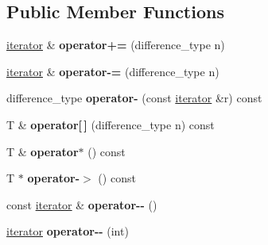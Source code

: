 \subsection*{Public Member Functions}
\begin{DoxyCompactItemize}
\item 
\hypertarget{classcircularDeque_1_1iterator_adab937de09a3bebfc08b5bdc13ab55c5}{\hyperlink{classcircularDeque_1_1iterator}{iterator} \& {\bfseries operator+=} (difference\+\_\+type n)}\label{classcircularDeque_1_1iterator_adab937de09a3bebfc08b5bdc13ab55c5}

\item 
\hypertarget{classcircularDeque_1_1iterator_ae465975e1491a6cb84a890ae8a762eea}{\hyperlink{classcircularDeque_1_1iterator}{iterator} \& {\bfseries operator-\/=} (difference\+\_\+type n)}\label{classcircularDeque_1_1iterator_ae465975e1491a6cb84a890ae8a762eea}

\item 
\hypertarget{classcircularDeque_1_1iterator_aec2396234b3a5d2d1449c5e83619917d}{difference\+\_\+type {\bfseries operator-\/} (const \hyperlink{classcircularDeque_1_1iterator}{iterator} \&r) const }\label{classcircularDeque_1_1iterator_aec2396234b3a5d2d1449c5e83619917d}

\item 
\hypertarget{classcircularDeque_1_1iterator_a21a49d0edbe140af0ed4b8ef1734f439}{T \& {\bfseries operator\mbox{[}$\,$\mbox{]}} (difference\+\_\+type n) const }\label{classcircularDeque_1_1iterator_a21a49d0edbe140af0ed4b8ef1734f439}

\item 
\hypertarget{classcircularDeque_1_1iterator_af85542e8915ee6e3cfd958221a789a52}{T \& {\bfseries operator$\ast$} () const }\label{classcircularDeque_1_1iterator_af85542e8915ee6e3cfd958221a789a52}

\item 
\hypertarget{classcircularDeque_1_1iterator_ad2d0ef1f228b917212a6d7a84fa6c938}{T $\ast$ {\bfseries operator-\/$>$} () const }\label{classcircularDeque_1_1iterator_ad2d0ef1f228b917212a6d7a84fa6c938}

\item 
\hypertarget{classcircularDeque_1_1iterator_ad85f34565b4f79c0e9c758e75594d04c}{const \hyperlink{classcircularDeque_1_1iterator}{iterator} \& {\bfseries operator-\/-\/} ()}\label{classcircularDeque_1_1iterator_ad85f34565b4f79c0e9c758e75594d04c}

\item 
\hypertarget{classcircularDeque_1_1iterator_a601345dba4440eaa80c372d8d6b1fd72}{\hyperlink{classcircularDeque_1_1iterator}{iterator} {\bfseries operator-\/-\/} (int)}\label{classcircularDeque_1_1iterator_a601345dba4440eaa80c372d8d6b1fd72}


\end{DoxyCompactItemize}
